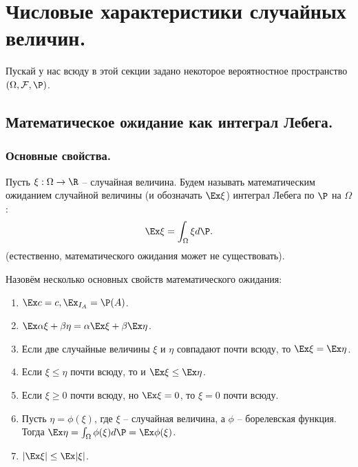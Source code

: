 \section{Числовые характеристики случайных величин.}
Пускай у нас всюду в этой секции задано некоторое вероятностное пространство $(\Omega, \mathcal{F}, \P)$.
\subsection{Математическое ожидание как интеграл Лебега.}
\subsubsection{Основные свойства.}
\begin{definition}
    Пусть $\xi: \Omega \to \R$ -- случайная величина.
    Будем называть математическим ожиданием случайной величины (и обозначать $\Ex \xi$) интеграл Лебега по $\P$ на $\Omega$:
    \[
        \Ex \xi = \int_{\Omega} \xi d\P.
    \]
    (естественно, математического ожидания может не существовать).
\end{definition}
Назовём несколько основных свойств математического ожидания:
\begin{enumerate}
    \item $\Ex c = c, \Ex_{I_A} = \P(A)$.
    \item $\Ex \alpha \xi + \beta \eta = \alpha \Ex \xi + \beta \Ex \eta$.
    \item Если две случайные величины $\xi$ и $\eta$ совпадают почти всюду, то $\Ex \xi = \Ex \eta$.
    \item Если $\xi \leq \eta$ почти всюду, то и $\Ex \xi \leq \Ex \eta$.
    \item Если $\xi \geq 0$ почти всюду, но $\Ex \xi = 0$, то $\xi = 0$ почти всюду.
    \item Пусть $\eta = \phi(\xi)$, где $\xi$ -- случайная величина, а $\phi$ -- борелевская функция.
    Тогда $\Ex \eta = \int_{\Omega} \phi(\xi)d\P = \Ex \phi(\xi)$.
    \item $|\Ex \xi| \leq \Ex |\xi|$.
\end{enumerate}
